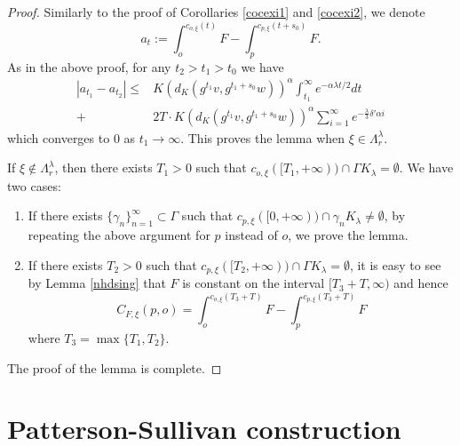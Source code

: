 \documentclass[11pt]{amsart}
\theoremstyle{definition}
\def\a{\alpha}
\def\c{\gamma}   \def\C{\Gamma}
\def\d{\delta}   %
\def\l{\lambda}   \def\L{\Lambda}
\begin{document}
\begin{proof}
Similarly to the proof of Corollaries \ref{cocexi1} and \ref{cocexi2}, we denote 
$$a_t:=\int_{o}^{c_{o,\xi}(t)}F-\int_{p}^{c_{p,\xi}(t+s_0)}F.$$ 
As in the above proof, for any $t_2>t_1>t_0$ we have
\begin{equation*}
    \begin{aligned}
\left|a_{t_1}-a_{t_2}\right|\le &K(d_K(g^{t_1}v, g^{t_{1}+s_0}w))^\a\int_{t_1}^{\infty}e^{-\a\l t/2}dt\\
+&2T\cdot K(d_K(g^{t_1}v, g^{t_{1}+s_0}w))^\a\sum_{i=1}^\infty e^{-\frac{\l}{3}\d'\a i}
    \end{aligned}
\end{equation*}
which converges to $0$ as $t_1\to\infty$. This proves the lemma when $\xi\in \L_r^\l$.

If $\xi\notin \L_r^\l$, then there exists $T_1>0$ such that $c_{o,\xi}([T_1, +\infty))\cap \C K_\l=\emptyset$. We have two cases:
\begin{enumerate}
    \item If there exists $\{\c_n\}_{n=1}^\infty\subset \C$ such that $c_{p,\xi}([0,+\infty))\cap \c_n K_\l\neq \emptyset$, by repeating the above argument for $p$ instead of $o$, we prove the lemma.
\item If there exists $T_2>0$ such that $c_{p,\xi}([T_2, +\infty))\cap \C K_\l=\emptyset$, it is easy to see by Lemma \ref{nhdsing} that $F$ is constant on the interval $[T_3+T,\infty)$ and hence
$$C_{F,\xi}(p, o)=\int_{o}^{c_{o,\xi}(T_3+T)}F-\int_{p}^{c_{p,\xi}(T_3+T)}F$$
where $T_3=\max\{T_1,T_2\}$.
\end{enumerate}
The proof of the lemma is complete.
\end{proof}

\section{Patterson-Sullivan construction}
\end{document}
